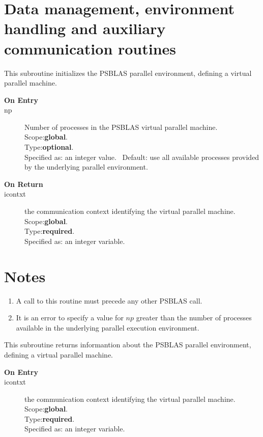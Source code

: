\section{Data management, environment handling  and auxiliary
  communication routines}
\label{sec:toolsrout}



This subroutine initializes the PSBLAS parallel environment, defining
a virtual parallel machine.
\begin{description}
\item[\bf  On Entry ]
\item[np] Number of processes in the PSBLAS virtual parallel machine.\\
Scope:{\bf global}.\\
Type:{\bf optional}.\\
Specified as: an integer value. \
Default: use all available processes provided by the underlying
parallel environment.
\end{description}

\begin{description}
\item[\bf On Return]
\item[icontxt] the communication context identifying the virtual
  parallel machine.\\
Scope:{\bf global}.\\
Type:{\bf required}.\\
Specified as: an integer variable.
\end{description}


\section*{Notes}
\begin{enumerate}
\item A call to this routine must precede any other PSBLAS call. 
\item It is an error to specify a value for $np$ greater than the
  number of processes available in the underlying parallel execution
  environment. 
\end{enumerate}




This subroutine returns informantion about  the PSBLAS parallel environment, defining
a virtual parallel machine.
\begin{description}
\item[\bf  On Entry ]
\item[icontxt] the communication context identifying the virtual
  parallel machine.\\
Scope:{\bf global}.\\
Type:{\bf required}.\\
Specified as: an integer variable.
\end{description}

